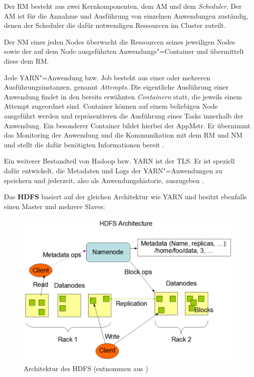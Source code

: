 Der \ac{RM} besteht aus zwei Kernkomponenten, dem \ac{AM} und dem \emph{Scheduler}.
Der \ac{AM} ist für die Annahme und Ausführung von einzelnen Anwendungen zuständig, denen der Scheduler die dafür notwendigen Ressourcen im Cluster zuteilt.

Der \ac{NM} eines jeden Nodes überwacht die Ressourcen seines jeweiligen Nodes sowie der auf dem Node ausgeführten Anwendungs"=Container und übermittelt diese dem \ac{RM}.

Jede YARN"=Anwendung bzw. Job besteht aus einer oder mehreren Ausführungsinstanzen, genannt \emph{Attempts}.
Die eigentliche Ausführung einer Anwendung findet in den bereits erwähnten \emph{Containern} statt, die jeweils einem Attempt zugeordnet sind.
Container können auf einem beliebigen Node ausgeführt werden und repräsentieren die Ausführung eines Tasks innerhalb der Anwendung.
Ein besonderer Container bildet hierbei der \ac{AppMstr}.
Er übernimmt das Monitoring der Anwendung und die Kommunikation mit dem \ac{RM} und \ac{NM} und stellt die dafür benötigten Informationen bereit \cite{HadoopYarnArch271}.

Ein weiterer Bestandteil von Hadoop bzw. YARN ist der \ac{TLS}.
Er ist speziell dafür entwickelt, die Metadaten und Logs der YARN"=Anwendungen zu speichern und jederzeit, also als Anwendungshistorie, auszugeben \cite{HadoopYarnTlServer271}.

Das \textbf{\ac{HDFS}} basiert auf der gleichen Architektur wie YARN und besitzt ebenfalls einen Master und mehrere Slaves:

\begin{figure}[h]
    \includegraphics{./images/hdfsarchitecture.png}
    \caption[Architektur des HDFS]
    {Architektur des \acs{HDFS} (entnommen aus \cite{HadoopHdfsDesc271})}
    \label{fig:hdfsarch}
\end{figure}


